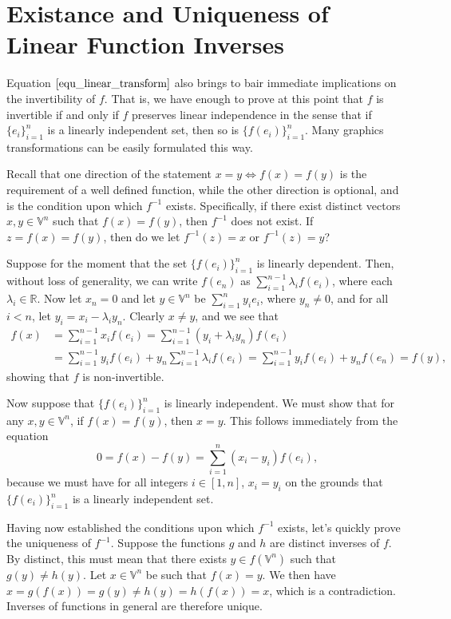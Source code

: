 \documentclass[12pt]{article}
\newcommand{\V}{\mathbb{V}}
\newcommand{\R}{\mathbb{R}}
\begin{document}
\section{Existance and Uniqueness of Linear Function Inverses}

Equation $\eqref{equ_linear_transform}$ also brings to bair immediate
implications on the invertibility of $f$.  That is, we have enough to
prove at this point that $f$ is invertible if and only if $f$ preserves
linear independence in the sense that if $\{e_i\}_{i=1}^n$ is a
linearly independent set, then so is $\{f(e_i)\}_{i=1}^n$.  Many graphics
transformations can be easily formulated this way.

Recall that one direction of the statement $x=y\iff f(x)=f(y)$ is the
requirement of a well defined function, while the other direction is optional,
and is the condition upon which $f^{-1}$ exists.  Specifically, if there
exist distinct vectors $x,y\in\V^n$ such that $f(x)=f(y)$, then
$f^{-1}$ does not exist.  If $z=f(x)=f(y)$, then do we let $f^{-1}(z)=x$
or $f^{-1}(z)=y$?

Suppose for the moment that the set $\{f(e_i)\}_{i=1}^n$ is linearly dependent.
Then, without loss of generality, we can write $f(e_n)$
as $\sum_{i=1}^{n-1}\lambda_i f(e_i)$, where each $\lambda_i\in\R$.
Now let $x_n=0$ and let $y\in\V^n$ be $\sum_{i=1}^n y_i e_i$, where $y_n\neq 0$,
and for all $i<n$, let $y_i=x_i-\lambda_i y_n$.  Clearly $x\neq y$, and we see that
\begin{align*}
f(x) &= \sum_{i=1}^{n-1} x_if(e_i)
 = \sum_{i=1}^{n-1}(y_i+\lambda_i y_n)f(e_i) \\
 &= \sum_{i=1}^{n-1}y_i f(e_i) + y_n\sum_{i=1}^{n-1}\lambda_i f(e_i)
 = \sum_{i=1}^{n-1}y_i f(e_i) + y_n f(e_n)
 = f(y),
\end{align*}
showing that $f$ is non-invertible.

Now suppose that $\{f(e_i)\}_{i=1}^n$ is linearly independent.  We must show
that for any $x,y\in\V^n$, if $f(x)=f(y)$, then $x=y$.  This follows immediately
from the equation
\begin{equation*}
0 = f(x)-f(y) = \sum_{i=1}^n(x_i-y_i)f(e_i),
\end{equation*}
because we must have for all integers $i\in[1,n]$, $x_i=y_i$ on the grounds
that $\{f(e_i)\}_{i=1}^n$ is a linearly independent set.

Having now established the conditions upon which $f^{-1}$ exists, let's quickly
prove the uniqueness of $f^{-1}$.  Suppose the functions $g$ and $h$ are
distinct inverses of $f$.  By distinct, this must mean that there exists $y\in f(\V^n)$
such that $g(y)\neq h(y)$.  Let $x\in\V^n$ be such that $f(x)=y$.  We then
have $x=g(f(x))=g(y)\neq h(y)=h(f(x))=x$, which is a contradiction.
Inverses of functions in general are therefore unique.
\end{document}
